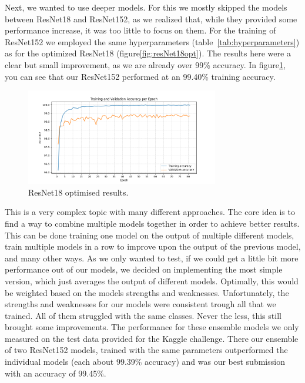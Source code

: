 \label{ResNet152}
Next, we wanted to use deeper models. For this we mostly skipped the models between ResNet18 and ResNet152, as we realized that, while they provided some performance increase, it was too little to focus on them. For the training of ResNet152 we employed the same hyperparameters (table~\ref{tab:hyperparameters}) as for the optimized ResNet18 (figure\ref{fig:resNet18opt}). The results here were a clear but small improvement, as we are already over 99\% accuracy. In figure\ref{fig:resNet152opt}, you can see that our ResNet152 performed at an 99.40\% training accuracy. 

\begin{figure}[ht]
    \centering
    \includegraphics[width=0.75\textwidth]{figures/model_152_v4_accuracy.png}
    \caption{ResNet18 optimised results.}\label{fig:resNet152opt}
\end{figure}

\label{ensembling}
This is a very complex topic with many different approaches. The core idea is to find a way to combine multiple models together in order to achieve better results. This can be done training one model on the output of multiple different models, train multiple models in a row to improve upon the output of the previous model, and many other ways. As we only wanted to test, if we could get a little bit more performance out of our models, we decided on implementing the most simple version, which just averages the output of different models. Optimally, this would be weighted based on the models strengths and weaknesses. Unfortunately, the strengths and weaknesses for our models were consistent trough all that we trained. All of them struggled with the same classes. Never the less, this still brought some improvements. The performance for these ensemble models we only measured on the test data provided for the Kaggle challenge. There our ensemble of two ResNet152 models, trained with the same parameters outperformed the individual models (each about 99.39\% accuracy) and was our best submission with an accuracy of 99.45\%.  
